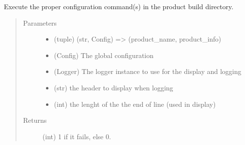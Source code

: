 \documentclass[a4paper,10pt,english]{sphinxmanual}
\begin{document}
\begin{fulllineitems}
\label{\detokenize{apidoc_commands/commands:commands.compile.compile_product}}
Execute the proper configuration command(s) 
in the product build directory.
\begin{quote}\begin{description}
\item[{Parameters}] \leavevmode\begin{itemize}
\item {} 
 \textendash{} (tuple) (str, Config) =\textgreater{} (product\_name, product\_info)

\item {} 
 \textendash{} (Config) The global configuration

\item {} 
 \textendash{} (Logger) 
The logger instance to use for the display and logging

\item {} 
 \textendash{} (str) the header to display when logging

\item {} 
 \textendash{} (int) the lenght of the the end of line (used in display)

\end{itemize}

\item[{Returns}] \leavevmode
(int) 1 if it fails, else 0.

\end{description}\end{quote}

\end{fulllineitems}

\end{document}
